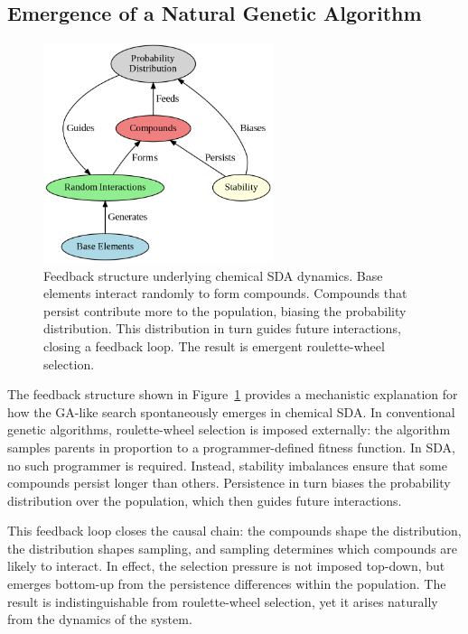 \documentclass[life,article,submit,pdftex,moreauthors]{Definitions/mdpi}
\begin{document}
\subsection{Emergence of a Natural Genetic Algorithm}

\begin{figure}[H]
    \centering
    \includegraphics[width=0.6\textwidth]{SDA-top-down.png}
    \caption{Feedback structure underlying chemical SDA dynamics. Base elements interact randomly to form compounds. Compounds that persist contribute more to the population, biasing the probability distribution. This distribution in turn guides future interactions, closing a feedback loop. The result is emergent roulette-wheel selection.}
    \label{fig:top-down}
\end{figure}

The feedback structure shown in Figure~\ref{fig:top-down} provides a mechanistic explanation for how the GA-like search spontaneously emerges in chemical SDA. In conventional genetic algorithms, roulette-wheel selection is imposed externally: the algorithm samples parents in proportion to a programmer-defined fitness function. In SDA, no such programmer is required. Instead, stability imbalances ensure that some compounds persist longer than others. Persistence in turn biases the probability distribution over the population, which then guides future interactions. 

This feedback loop closes the causal chain: the compounds shape the distribution, the distribution shapes sampling, and sampling determines which compounds are likely to interact. In effect, the selection pressure is not imposed top-down, but emerges bottom-up from the persistence differences within the population. The result is indistinguishable from roulette-wheel selection, yet it arises naturally from the dynamics of the system.
\end{document}
